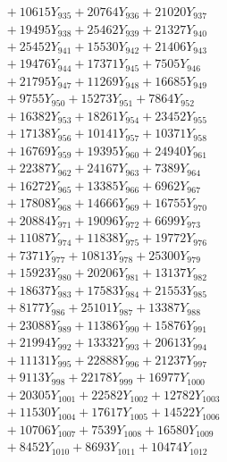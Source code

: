 \documentclass[a4paper,10pt]{article}
\begin{document}
{\begin{align}
&\;  + 10615 Y_{935} + 20764 Y_{936} + 21020 Y_{937} \\[0.3ex]
&\;  + 19495 Y_{938} + 25462 Y_{939} + 21327 Y_{940} \\[0.3ex]
&\;  + 25452 Y_{941} + 15530 Y_{942} + 21406 Y_{943} \\[0.3ex]
&\;  + 19476 Y_{944} + 17371 Y_{945} + 7505 Y_{946} \\[0.3ex]
&\;  + 21795 Y_{947} + 11269 Y_{948} + 16685 Y_{949} \\[0.3ex]
&\;  + 9755 Y_{950} + 15273 Y_{951} + 7864 Y_{952} \\[0.3ex]
&\;  + 16382 Y_{953} + 18261 Y_{954} + 23452 Y_{955} \\[0.3ex]
&\;  + 17138 Y_{956} + 10141 Y_{957} + 10371 Y_{958} \\[0.5ex]\allowbreak
&\;  + 16769 Y_{959} + 19395 Y_{960} + 24940 Y_{961} \\[0.3ex]
&\;  + 22387 Y_{962} + 24167 Y_{963} + 7389 Y_{964} \\[0.3ex]
&\;  + 16272 Y_{965} + 13385 Y_{966} + 6962 Y_{967} \\[0.3ex]
&\;  + 17808 Y_{968} + 14666 Y_{969} + 16755 Y_{970} \\[0.3ex]
&\;  + 20884 Y_{971} + 19096 Y_{972} + 6699 Y_{973} \\[0.3ex]
&\;  + 11087 Y_{974} + 11838 Y_{975} + 19772 Y_{976} \\[0.3ex]
&\;  + 7371 Y_{977} + 10813 Y_{978} + 25300 Y_{979} \\[0.3ex]
&\;  + 15923 Y_{980} + 20206 Y_{981} + 13137 Y_{982} \\[0.3ex]
&\;  + 18637 Y_{983} + 17583 Y_{984} + 21553 Y_{985} \\[0.3ex]
&\;  + 8177 Y_{986} + 25101 Y_{987} + 13387 Y_{988} \\[0.5ex]\allowbreak
&\;  + 23088 Y_{989} + 11386 Y_{990} + 15876 Y_{991} \\[0.3ex]
&\;  + 21994 Y_{992} + 13332 Y_{993} + 20613 Y_{994} \\[0.3ex]
&\;  + 11131 Y_{995} + 22888 Y_{996} + 21237 Y_{997} \\[0.3ex]
&\;  + 9113 Y_{998} + 22178 Y_{999} + 16977 Y_{1000} \\[0.3ex]
&\;  + 20305 Y_{1001} + 22582 Y_{1002} + 12782 Y_{1003} \\[0.3ex]
&\;  + 11530 Y_{1004} + 17617 Y_{1005} + 14522 Y_{1006} \\[0.3ex]
&\;  + 10706 Y_{1007} + 7539 Y_{1008} + 16580 Y_{1009} \\[0.3ex]
&\;  + 8452 Y_{1010} + 8693 Y_{1011} + 10474 Y_{1012} \\[0.3ex]

\end{align}}
\end{document}
